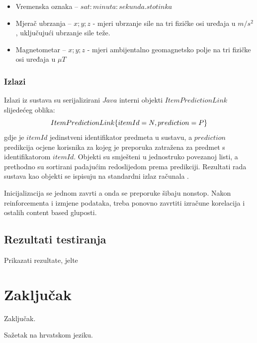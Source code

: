 \documentclass[times, utf8, diplomski, numeric]{fer}
\begin{document}
\begin{itemize}
  \item Vremenska oznaka -- $sat:minuta:sekunda.stotinka$
  \item Mjerač ubrzanja -- $x;y;z$ - mjeri ubrzanje sile na tri fizičke osi
  uređaja u $m/s^2$, uključujući ubrzanje sile teže.
  \item Magnetometar -- $x;y;z$ - mjeri ambijentalno geomagnetsko polje na tri
  fizičke osi uređaja u $\mu T$
\end{itemize}

\subsection{Izlazi}

Izlazi iz sustava su serijalizirani $Java$ interni objekti $ItemPredictionLink$
slijedećeg oblika:
\begin{equation}
	\centering
	ItemPredictionLink\{ 
		itemId=N,
		prediction=P
	\}
\end{equation}
gdje je $itemId$ jedinstveni identifikator predmeta u sustavu, a $prediction$
predikcija ocjene korisnika za kojeg je preporuka zatražena za predmet s
identifikatorom $itemId$. Objekti su smješteni u jednostruko povezanoj listi, a
prethodno su sortirani padajućim redoslijedom prema predikciji. Rezultati rada
sustava kao objekti se ispisuju na standardni izlaz računala .




Inicijalizacija se jednom zavrti a onda se preporuke šibaju nonstop. Nakon
reinforcementa i izmjene podataka, treba ponovno zavrtiti izračune korelacija i
ostalih content based gluposti.

\section{Rezultati testiranja}
Prikazati rezultate, jelte

\chapter{Zaključak}
Zaključak.




\begin{sazetak}
Sažetak na hrvatskom jeziku.

\end{sazetak}
\end{document}
